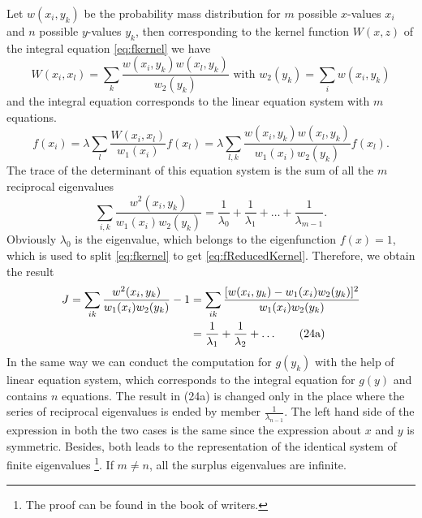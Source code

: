 \documentclass{article}
\begin{document}
Let $w(x_i, y_k)$
be the probability mass distribution for $m$ possible $x$-values $x_i$
and $n$ possible $y$-values $y_k$, then corresponding to
the kernel function $W(x,z)$ of the integral equation \eqref{eq:fkernel}
we have
$$
W(x_i, x_l)
= \sum_k \frac{w(x_i, y_k) w(x_l, y_k)}{w_2(y_k)}
\textrm{ with } w_2(y_k) = \sum_i w(x_i, y_k)
$$
and the integral equation corresponds to the linear equation system
with $m$ equations.
$$
f(x_i) = \lambda \sum_{l}
\frac{W(x_i, x_l)}{w_1(x_i)} f(x_l)
=\lambda  \sum_{l,k} \frac{w(x_i, y_k) w(x_l, y_k)}{w_1(x_i)w_2(y_k)}
f(x_l).
$$
The trace of the determinant of this equation system is
the sum of all the $m$ reciprocal eigenvalues
$$
\sum_{i,k} \frac{w^2(x_i,y_k)}{w_1(x_i)w_2(y_k)}
= \frac{1}{\lambda_0}
+ \frac{1}{\lambda_1}
+ \dots + \frac{1}{\lambda_{m-1}}.
$$
Obviously $\lambda_0$ is the eigenvalue, which belongs to the eigenfunction
$f(x)=1$, which is used to split \eqref{eq:fkernel} to get \eqref{eq:fReducedKernel}.
Therefore, we obtain the result
\begin{align}
    J=\sum_{ik}  \frac{w^2(x_i,y_k)}{w_1(x_i) w_2(y_k)} -1
    &=\sum_{ik} \frac{[w(x_i,y_k) - w_1(x_i)w_2(y_k)]^2}{w_1(x_i)w_2(y_k)} \notag\\
    &= \frac{1}{\lambda_1}
+ \frac{1}{\lambda_2}
+ \dots \tag{24a}
\end{align}
In the same way we can conduct the computation for $g(y_k)$
with the help of linear equation system, which corresponds to the
integral equation for $g(y)$
and contains $n$ equations. The result in (24a)
is changed only in the place where the series of reciprocal
eigenvalues is ended by member $\frac{1}{\lambda_{n-1}}$.
The left hand side of the expression in both the two cases
is the same since the expression about $x$
and $y$ is symmetric. Besides,
both leads to the representation of the identical system of finite eigenvalues \footnote{The proof can be found in the book of writers.}.
If $m\neq n$, all the surplus eigenvalues are infinite.
\end{document}
